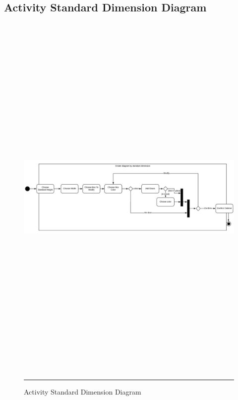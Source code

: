     \subsection{Activity Standard Dimension Diagram}
        \vfill
        \begin{figure}[h!]
            \centering
			\includegraphics[angle = 90, height=185mm]{Figures/ActivityStandardDiagram.png}
			\rule{35em}{0.5pt}
			\caption{Activity Standard Dimension Diagram}
			\label{activitystandartdiagram}
    	\end{figure}
        \vfill
        
    \newpage
